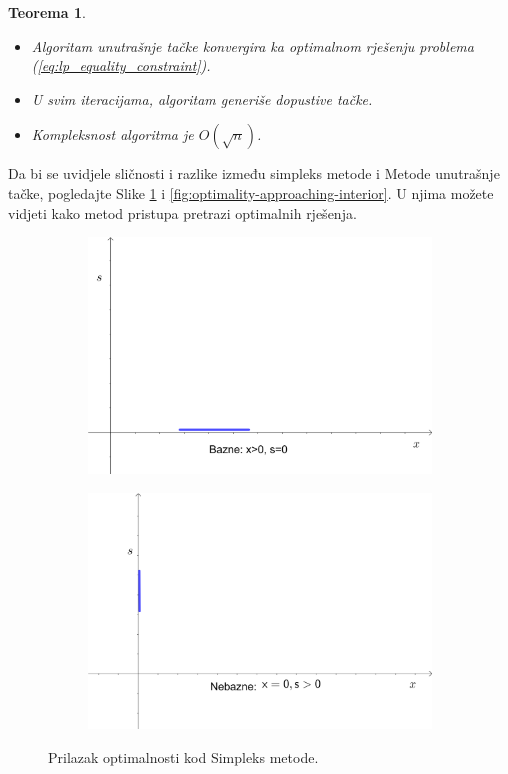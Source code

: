 \documentclass[a4paper, utf8, 11pt, colorlinks]{book}
\newtheorem{thm}{Teorema}
\begin{document}
\begin{thm}
	\begin{itemize}
		\item Algoritam unutrašnje tačke konvergira ka optimalnom rješenju problema (\ref{eq:lp_equality_constraint}). %
		\item U svim iteracijama, algoritam generiše dopustive tačke.
		\item Kompleksnost algoritma je $O(\sqrt{n})$. %
	\end{itemize}
\end{thm}

Da bi se uvidjele sličnosti i razlike između simpleks metode i Metode unutrašnje tačke, pogledajte Slike \ref{fig:optimality-approaching-simplex} i  \ref{fig:optimality-approaching-interior}. U njima možete vidjeti kako metod pristupa pretrazi optimalnih rješenja. 

\begin{figure}
	\centering
	 	\begin{subfigure}{.45\textwidth}
	 	\centering
	 	\includegraphics[width=.9\linewidth]{interior-1}  
	 \end{subfigure}
 	 	\begin{subfigure}{.45\textwidth}
 	\centering
 	\includegraphics[width=.9\linewidth]{interior-2}  
 \end{subfigure}
  \caption{Prilazak optimalnosti kod Simpleks metode.}
   \label{fig:optimality-approaching-simplex}
\end{figure}
\end{document}
